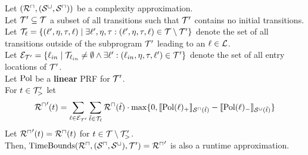\begin{theorem}[TimeBounds]
  Let $({\mathcal{R}^\sqcap}, {({\mathcal{S}^\sqcup}, {\mathcal{S}^\sqcap})})$ be a complexity approximation. \\
  Let $\mathcal{T}' \subseteq \mathcal{T}$ a subset of all transitions such that $\mathcal{T}'$ contains no initial transitions. \\
  Let $\mathcal{T}_{\ell} = \lbrace (\ell', \eta, \tau, \ell) \mid \exists \ell', \eta, \tau: (\ell', \eta, \tau, \ell) \in \mathcal{T} \setminus \mathcal{T}' \rbrace$ denote the set of all transitions outside of the subprogram $\mathcal{T}'$ leading to an $\ell \in \mathcal{L}$. \\
  Let $\mathcal{E}_{\mathcal{T}'} = \lbrace \ell_{in} \mid \mathcal{T}_{\ell_{in}} \neq \emptyset \wedge \exists \ell': (\ell_{in}, \eta, \tau, \ell') \in \mathcal{T}' \rbrace$ denote the set of all entry locations of $\mathcal{T}'$. \\
  Let $\text{Pol}$ be a \textbf{linear} PRF for $\mathcal{T}'$. \\
  For $t \in \mathcal{T}'_>$ let
  \[ {\mathcal{R}^\sqcap}'(t) = \sum_{\ell \in \mathcal{E}_{\mathcal{T}'}} \sum_{\tilde{t} \in \mathcal{T}_\ell} {\mathcal{R}^\sqcap}(\tilde{t}) \cdot \max \lbrace 0, \llbracket \text{Pol}(\ell)_+ \rrbracket_{{\mathcal{S}^\sqcap}(\tilde{t})} - \llbracket \text{Pol}(\ell)_- \rrbracket_{{\mathcal{S}^\sqcup}(\tilde{t})} \rbrace \]
  Let ${\mathcal{R}^\sqcap}'(t) = {\mathcal{R}^\sqcap}(t)$ for $t \in \mathcal{T} \setminus \mathcal{T}'_>$. \\
  Then, $\text{TimeBounds}({\mathcal{R}^\sqcap}, ({\mathcal{S}^\sqcap}, {\mathcal{S}^\sqcup}), \mathcal{T}') = {\mathcal{R}^\sqcap}'$ is also a runtime approximation.
\end{theorem}
